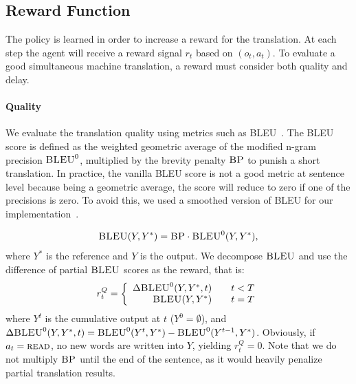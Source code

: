 

\subsection{Reward Function}
\label{cp9.sec.reward}

The policy is learned in order to increase a reward for the translation. At each step the agent will receive a reward signal $r_t$ based on $(o_t, a_t)$. To evaluate a good simultaneous machine translation, a reward must consider both quality and delay. 

\paragraph{Quality} We evaluate the translation quality using metrics such as BLEU~\cite{papineni2002bleu}. The BLEU score is defined as the weighted geometric average of the modified n-gram precision $\textsc{BLEU}^0$, multiplied by the brevity penalty $\textsc{BP}$ to punish a short translation. In practice, the vanilla BLEU score is not a good metric at sentence level because being a geometric average, the score will reduce to zero if one of the precisions is zero. To avoid this, we used a smoothed version of BLEU for our implementation~\cite{lin2004automatic}.

\begin{equation}
    \textsc{BLEU}(Y, Y^*) = \textsc{BP} \cdot \textsc{BLEU}^0(Y, Y^*),
\end{equation}
where $Y^*$ is the reference and $Y$ is the output.  
We decompose $\textsc{BLEU}$ and use the difference of partial $\textsc{BLEU}$ scores as the reward, that is:
\begin{equation}
    r_t^Q=\left\{
\begin{array}{rcl}
\Delta\textsc{BLEU}^0(Y, Y^*, t)     &      & {t < T}\\
\textsc{BLEU}(Y, Y^*)    &      & {t = T}
\end{array} \right. 
\end{equation}
where $Y^t$ is the cumulative output at $t$ ($Y^0=\emptyset$), and $\Delta\textsc{BLEU}^0(Y, Y^*, t) = \textsc{BLEU}^0(Y^t, Y^*) - \textsc{BLEU}^0(Y^{t-1}, Y^*)$. Obviously, if $a_t=\textsc{read}$, no new words are written into $Y$, yielding $r_t^Q=0$. Note that we do not multiply $\textsc{BP}$
until the end of the sentence, as it would heavily penalize partial translation results.

